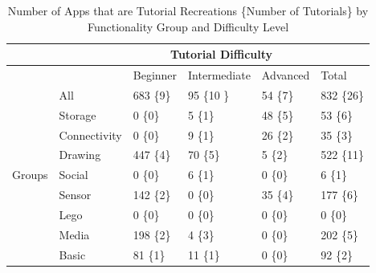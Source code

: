\documentclass[conference]{IEEEtran}
\begin{document}
\begin{table}[h!]
\renewcommand{\arraystretch}{1.3}
\caption{Number of Apps that are Tutorial Recreations \{Number of Tutorials\} by Functionality Group and Difficulty Level}
\label{table_tutorial_group}
\centering
\begin{tabular}{| l | l | l | l | l | l |}
\hline
\multicolumn{2}{|c|}{}&
\multicolumn{3}{|c|}{Tutorial Difficulty}&
\\
\hline
\multicolumn{2}{|c|}{}&
Beginner&
Intermediate&
Advanced&
Total\\
\hline
\multirow{9}{*}{Groups} 
&All& 683 \{9\} & 95 \{10 \} & 54 \{7\} & 832 \{26\}\\

&Storage& 0 \{0\}& 5 \{1\} & 48 \{5\} & 53 \{6\}\\

&Connectivity & 0 \{0\} & 9 \{1\} & 26 \{2\} & 35 \{3\}\\

&Drawing &447 \{4\} &70 \{5\} & 5 \{2\} &522 \{11\} \\

&Social & 0 \{0\} &6 \{1\} & 0 \{0\} &6 \{1\}\\

&Sensor &142 \{2\} & 0 \{0\} & 35 \{4\} &177 \{6\}\\

&Lego &0 \{0\} &0 \{0\} &0 \{0\} &0 \{0\}\\

&Media &198 \{2\} &4 \{3\} &0 \{0\} &202 \{5\}\\

&Basic &81 \{1\} &11 \{1\} &0 \{0\} &92 \{2\}\\
\hline


\end{tabular}
\end{table}
\end{document}
